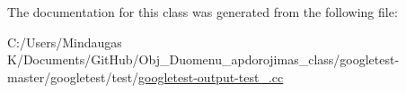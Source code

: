 The documentation for this class was generated from the following file\+:\begin{DoxyCompactItemize}
\item 
C\+:/\+Users/\+Mindaugas K/\+Documents/\+Git\+Hub/\+Obj\+\_\+\+Duomenu\+\_\+apdorojimas\+\_\+class/googletest-\/master/googletest/test/\mbox{\hyperlink{googletest-master_2googletest_2test_2googletest-output-test___8cc}{googletest-\/output-\/test\+\_\+.\+cc}}\end{DoxyCompactItemize}
